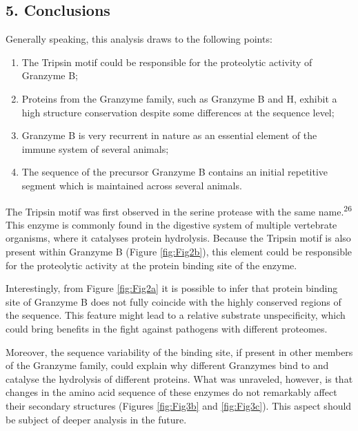 \documentclass[
]{article}
\begin{document}
\hypertarget{conclusions}{%
\subsection*{5. Conclusions}\label{conclusions}}

Generally speaking, this analysis draws to the following points:

\begin{enumerate}
\def\labelenumi{\arabic{enumi}.}
\item
  The Tripsin motif could be responsible for the proteolytic activity of Granzyme B;
\item
  Proteins from the Granzyme family, such as Granzyme B and H, exhibit a high structure conservation despite some differences at the sequence level;
\item
  Granzyme B is very recurrent in nature as an essential element of the immune system of several animals;
\item
  The sequence of the precursor Granzyme B contains an initial repetitive segment which is maintained across several animals.
\end{enumerate}

The Tripsin motif was first observed in the serine protease with the same name.\textsuperscript{26} This enzyme is commonly found in the digestive system of multiple vertebrate organisms, where it catalyses protein hydrolysis. Because the Tripsin motif is also present within Granzyme B (Figure \ref{fig:Fig2b}), this element could be responsible for the proteolytic activity at the protein binding site of the enzyme.

Interestingly, from Figure \ref{fig:Fig2a} it is possible to infer that protein binding site of Granzyme B does not fully coincide with the highly conserved regions of the sequence. This feature might lead to a relative substrate unspecificity, which could bring benefits in the fight against pathogens with different proteomes.

Moreover, the sequence variability of the binding site, if present in other members of the Granzyme family, could explain why different Granzymes bind to and catalyse the hydrolysis of different proteins. What was unraveled, however, is that changes in the amino acid sequence of these enzymes do not remarkably affect their secondary structures (Figures \ref{fig:Fig3b} and \ref{fig:Fig3c}). This aspect should be subject of deeper analysis in the future.
\end{document}
